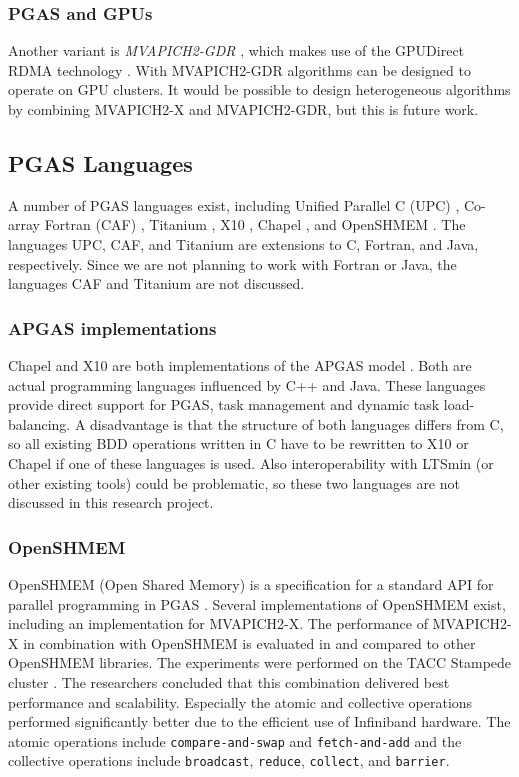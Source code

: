 \subsubsection{PGAS and GPUs}
Another variant is \emph{MVAPICH2-GDR} \cite{Wang:2011:MOG:1997883.1997893}, which makes use of the GPUDirect RDMA technology \cite{gpudirect}. With MVAPICH2-GDR algorithms can be designed to operate on GPU clusters. It would be possible to design heterogeneous algorithms by combining MVAPICH2-X and MVAPICH2-GDR, but this is future work.

\subsection{PGAS Languages}
A number of PGAS languages exist, including Unified Parallel C (UPC) \cite{upc}, Co-array Fortran (CAF) \cite{numrich1998co}, Titanium \cite{aiken1997titanium}, X10 \cite{Charles:2005:XOA:1103845.1094852}, Chapel \cite{Chamberlain:2007:PPC:1286120.1286123}, and OpenSHMEM \cite{openshmem}. The languages UPC, CAF, and Titanium are extensions to C, Fortran, and Java, respectively. Since we are not planning to work with Fortran or Java, the languages CAF and Titanium are not discussed. 

\subsubsection{APGAS implementations}
Chapel and X10 are both implementations of the APGAS model \cite{Chamberlain:2007:PPC:1286120.1286123, Charles:2005:XOA:1103845.1094852}. Both are actual programming languages influenced by C++ and Java. These languages provide direct support for PGAS, task management and dynamic task load-balancing. A disadvantage is that the structure of both languages differs from C, so all existing BDD operations written in C have to be rewritten to X10 or Chapel if one of these languages is used. Also interoperability with LTSmin (or other existing tools) could be problematic, so these two languages are not discussed in this research project.

\subsubsection{OpenSHMEM}
OpenSHMEM (Open Shared Memory) is a specification for a standard API for parallel programming in PGAS \cite{openshmem}. Several implementations of OpenSHMEM exist, including an implementation for MVAPICH2-X. The performance of MVAPICH2-X in combination with OpenSHMEM is evaluated in \cite{openshmem_perf_evaluation} and compared to other OpenSHMEM libraries. The experiments were performed on the TACC Stampede cluster \cite{stampede_cluster}. The researchers concluded that this combination delivered best performance and scalability. Especially the atomic and collective operations performed significantly better due to the efficient use of Infiniband hardware. The atomic operations include \texttt{compare-and-swap} and \texttt{fetch-and-add} and the collective operations include \texttt{broadcast}, \texttt{reduce}, \texttt{collect}, and \texttt{barrier}. 

